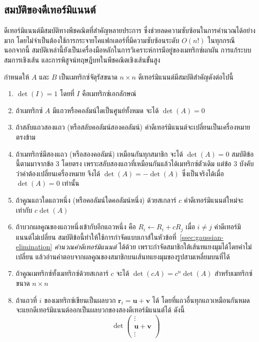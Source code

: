 \subsection{สมบัติของดีเทอร์มิแนนต์}
ดีเทอร์มิแนนต์มีสมบัติทางพีชคณิตที่สำคัญหลายประการ ซึ่งช่วยลดความซับซ้อนในการคำนวณได้อย่างมาก โดยไม่จำเป็นต้องใช้การกระจายโคแฟกเตอร์ที่มีความซับซ้อนระดับ $O(n!)$ ในทุกกรณี นอกจากนี้ สมบัติเหล่านี้ยังเป็นเครื่องมือหลักในการวิเคราะห์การมีอยู่ของเมทริกซ์ผกผัน การแก้ระบบสมการเชิงเส้น และการพิสูจน์ทฤษฎีบทในพีชคณิตเชิงเส้นขั้นสูง~\parencite{lay2021linear}

\begin{thrm}
กำหนดให้ $A$ และ $B$ เป็นเมทริกซ์จัตุรัสขนาด $n \times n$ ดีเทอร์มิแนนต์มีสมบัติสำคัญดังต่อไปนี้
\begin{enumerate}[leftmargin=1.8em,itemsep=0.3em]
    \item $\det(I) = 1$ โดยที่ $I$ คือเมทริกซ์เอกลักษณ์
    \item ถ้าเมทริกซ์ $A$ มีแถวหรือคอลัมน์ใดเป็นศูนย์ทั้งหมด จะได้ $\det(A) = 0$
    \item ถ้าสลับแถวสองแถว (หรือสลับคอลัมน์สองคอลัมน์) ค่าดีเทอร์มิแนนต์จะเปลี่ยนเป็นเครื่องหมายตรงข้าม
    \item ถ้าเมทริกซ์มีสองแถว (หรือสองคอลัมน์) เหมือนกันทุกสมาชิก จะได้ $\det(A) = 0$ สมบัติข้อนี้ตามมาจากข้อ 3 โดยตรง เพราะสลับสองแถวที่เหมือนกันแล้วได้เมทริกซ์ตัวเดิม แต่ข้อ 3 บังคับว่าค่าต้องเปลี่ยนเครื่องหมาย จึงได้ $\det(A) = -\det(A)$ ซึ่งเป็นจริงได้เมื่อ $\det(A) = 0$ เท่านั้น
    \item ถ้าคูณแถวใดแถวหนึ่ง (หรือคอลัมน์ใดคอลัมน์หนึ่ง) ด้วยสเกลาร์ $c$ ค่าดีเทอร์มิแนนต์ใหม่จะเท่ากับ $c \det(A)$
    \item ถ้าบวกผลคูณของแถวหนึ่งเข้ากับอีกแถวหนึ่ง คือ $R_i \leftarrow R_i + cR_j$ เมื่อ $i \neq j$ ค่าดีเทอร์มิแนนต์ไม่เปลี่ยน สมบัติข้อนี้ทำให้ใช้การกำจัดแบบเกาส์ในหัวข้อที่~\ref{ssec:gaussian-elimination} \emph{คำนวณค่าดีเทอร์มิแนนต์} ได้ด้วย เพราะกำจัดสมาชิกใต้เส้นทแยงมุมได้โดยค่าไม่เปลี่ยน แล้วอ่านคำตอบจากผลคูณของสมาชิกบนเส้นทแยงมุมของรูปสามเหลี่ยมบนที่ได้
    \item ถ้าคูณเมทริกซ์ทั้งเมทริกซ์ด้วยสเกลาร์ $c$ จะได้ $\det(cA) = c^n \det(A)$ สำหรับเมทริกซ์ขนาด $n \times n$
    \item ถ้าแถวที่ $i$ ของเมทริกซ์เขียนเป็นผลบวก $\mathbf{r}_i = \mathbf{u} + \mathbf{v}$ ได้ โดยที่แถวอื่นทุกแถวเหมือนกันหมด จะแยกดีเทอร์มิแนนต์ออกเป็นผลบวกของสองดีเทอร์มิแนนต์ได้ ดังนี้
    \[
    \det\begin{pmatrix} \vdots \\ \mathbf{u} + \mathbf{v} \\ \vdots \end{pmatrix}
\]
\end{enumerate}
\end{thrm}

